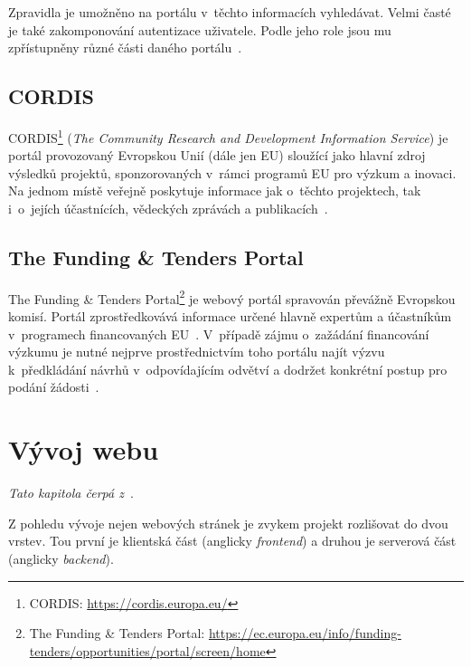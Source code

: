 Zpravidla je umožněno na portálu v~těchto informacích vyhledávat. Velmi časté je také zakomponování autentizace uživatele. Podle jeho role jsou mu zpřístupněny různé části daného portálu~\cite{bib:portal-indiana}.

\blindtext[2]

\subsection{CORDIS}
CORDIS\footnote{CORDIS: \url{https://cordis.europa.eu/}} (\emph{The Community Research and Development Information Service}) je portál provozovaný Evropskou Unií (dále jen EU) sloužící jako hlavní zdroj výsledků projektů, sponzorovaných v~rámci programů EU pro výzkum a inovaci. Na jednom místě veřejně poskytuje informace jak o~těchto projektech, tak i~o~jejích účastnících, vědeckých zprávách a publikacích~\cite{bib:cordis}.

\subsection{The Funding \& Tenders Portal}\label{section:funding}

The Funding \& Tenders Portal\footnote{The Funding \& Tenders Portal: \url{https://ec.europa.eu/info/funding-tenders/opportunities/portal/screen/home}} je webový portál spravován převážně Evropskou komisí. Portál zprostředkovává informace určené hlavně expertům a účastníkům v~programech financovaných EU~\cite{bib:funding-about}.
V~případě zájmu o~zažádání financování výzkumu je nutné nejprve prostřednictvím toho portálu najít výzvu k~předkládání návrhů v~odpovídajícím odvětví a dodržet konkrétní postup pro podání žádosti~\cite{bib:funding-find}.



\section{Vývoj webu}
\emph{Tato kapitola čerpá z~\cite{bib:web-development}}.

Z pohledu vývoje nejen webových stránek je zvykem projekt rozlišovat do dvou vrstev. Tou první je klientská část (anglicky \emph{frontend}) a druhou je serverová část (anglicky \emph{backend}).

